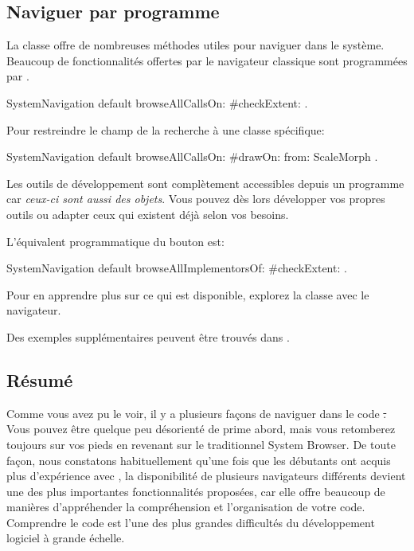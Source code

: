 \documentclass[a4paper,10pt,twoside]{book}
\begin{document}
\subsection{Naviguer par programme}

La classe  offre de nombreuses m\'ethodes utiles
pour naviguer dans le syst\`eme.
Beaucoup de fonctionnalit\'es offertes par le navigateur classique
sont programm\'ees par
.


\begin{code}{}
SystemNavigation default browseAllCallsOn: #checkExtent: .
\end{code}
Pour restreindre le champ de la recherche \`a une classe sp\'ecifique:
\begin{code}{}
SystemNavigation default browseAllCallsOn: #drawOn: from: ScaleMorph .
\end{code}
Les outils de d\'eveloppement sont compl\`{e}tement accessibles depuis un
programme car \emph{ceux-ci sont aussi des objets}. Vous pouvez d\`es lors
d\'evelopper vos propres outils ou adapter ceux qui existent d\'ej\`a
selon vos besoins.

L'\'equivalent programmatique du bouton  est:
\begin{code}{}
SystemNavigation default browseAllImplementorsOf: #checkExtent: .
\end{code}

Pour en apprendre plus sur ce qui est disponible, explorez la classe
 avec le navigateur.

Des exemples suppl\'ementaires peuvent \^etre trouv\'es dans
 .


\subsection{R\'esum\'e}

Comme vous avez pu le voir, il y a plusieurs fa\c{c}ons de naviguer
dans le code \st.
Vous pouvez \^etre quelque peu d\'esorient\'e de prime abord, mais
vous retomberez toujours sur vos pieds en revenant sur le 
traditionnel System Browser.
De toute fa\c{c}on, nous constatons habituellement qu'une fois que les
d\'ebutants ont acquis plus d'exp\'erience avec \pharo, la disponibilit\'e
de plusieurs navigateurs diff\'erents devient une des plus
importantes fonctionnalit\'es propos\'ees, car elle offre beaucoup de
mani\`eres d'appr\'ehender la compr\'ehension et l'organisation de votre
code.
Comprendre le code est l'une des plus grandes difficult\'es du d\'eveloppement
logiciel \`a grande \'echelle.
\end{document}
